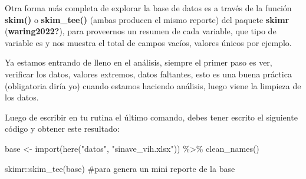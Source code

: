 \documentclass[
  letterpaper,
  DIV=11,
  numbers=noendperiod]{scrreprt}
\newenvironment{Shaded}{\begin{snugshade}}{\end{snugshade}}
\newcommand{\CommentTok}[1]{\textcolor[rgb]{0.37,0.37,0.37}{#1}}
\newcommand{\FunctionTok}[1]{\textcolor[rgb]{0.28,0.35,0.67}{#1}}
\newcommand{\NormalTok}[1]{\textcolor[rgb]{0.00,0.23,0.31}{#1}}
\newcommand{\OtherTok}[1]{\textcolor[rgb]{0.00,0.23,0.31}{#1}}
\newcommand{\SpecialCharTok}[1]{\textcolor[rgb]{0.37,0.37,0.37}{#1}}
\newcommand{\StringTok}[1]{\textcolor[rgb]{0.13,0.47,0.30}{#1}}
\begin{document}
Otra forma más completa de explorar la base de datos es a través de la
función \textbf{skim()} o \textbf{skim\_tee()} (ambas producen el mismo
reporte) del paquete \textbf{skimr} (\textbf{waring2022?}), para
proveernos un resumen de cada variable, que tipo de variable es y nos
muestra el total de campos vacíos, valores únicos por ejemplo.

Ya estamos entrando de lleno en el análisis, siempre el primer paso es
ver, verificar los datos, valores extremos, datos faltantes, esto es una
buena práctica (obligatoria diría yo) cuando estamos haciendo análisis,
luego viene la limpieza de los datos.

Luego de escribir en tu rutina el último comando, debes tener escrito el
siguiente código y obtener este resultado:

\begin{Shaded}
\begin{Highlighting}[]
\NormalTok{base }\OtherTok{\textless{}{-}} \FunctionTok{import}\NormalTok{(}\FunctionTok{here}\NormalTok{(}\StringTok{"datos"}\NormalTok{, }\StringTok{"sinave\_vih.xlsx"}\NormalTok{)) }\SpecialCharTok{\%\textgreater{}\%} 
  \FunctionTok{clean\_names}\NormalTok{()}

\NormalTok{skimr}\SpecialCharTok{::}\FunctionTok{skim\_tee}\NormalTok{(base) }\CommentTok{\#para genera un mini reporte de la base}
\end{Highlighting}
\end{Shaded}
\end{document}
